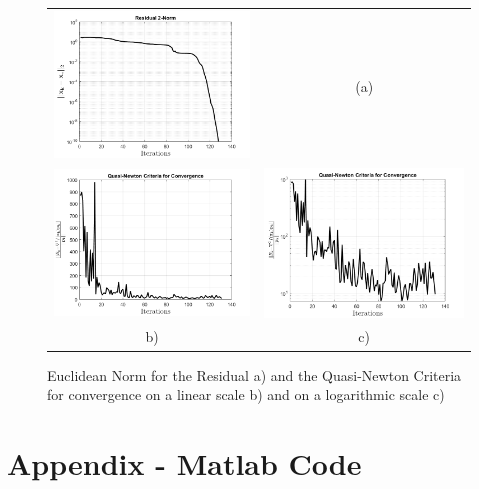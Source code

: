 \documentclass[a4paper,11pt]{article}
\begin{document}
\begin{figure}[!ht]
	\centering
	\begin{tabular}{cc}
		\includegraphics[width=.55\textwidth]{Residual} &\hspace{-25pt}
		(a)\\
		\includegraphics[width=.55\textwidth]{QN} &\hspace{-25pt} \includegraphics[width=.55\textwidth]{QN_semilogy} \\
		b) & c)\\
	\end{tabular}
	\caption{Euclidean Norm for the Residual a) and the Quasi-Newton Criteria for convergence on a linear scale b) and on a logarithmic scale c)}
	\label{}
\end{figure}

\clearpage
\section*{Appendix - Matlab Code}
\end{document}

